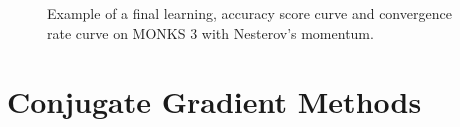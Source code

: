 \begin{appendices}
\begin{figure}[H]
\begin{subfigure}{0.40\textwidth}
                    \label{fig:monks_3_ACC_SGD}
                \end{subfigure}
                \begin{subfigure}{0.40\textwidth}
                    \caption{}
                    \label{fig:monks_3_NORM_SGD}
                \end{subfigure}
                \caption{Example of a final learning, accuracy score curve and
                convergence rate curve on MONKS 3 with Nesterov's momentum.}
                \label{fig:monks_1_SGD}
            \end{figure}


         \section{Conjugate Gradient Methods} %
         \label{sec:conjugate_gradient_methods}


\end{appendices}
